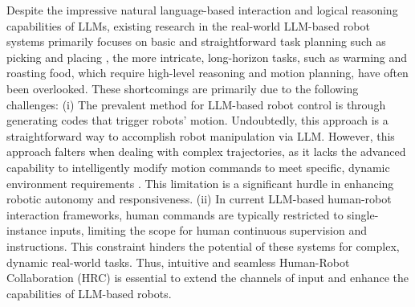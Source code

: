 \documentclass[letterpaper,conference]{ieeeconf}
\begin{document}
Despite the impressive natural language-based interaction and logical reasoning capabilities of LLMs, existing research in the real-world LLM-based robot systems primarily focuses on basic and straightforward task planning such as picking and placing \cite{singh2023progprompt,zhao2023differentiable}, the more intricate, long-horizon tasks, such as warming and roasting food, which require high-level reasoning and motion planning, have often been overlooked. 
These shortcomings are primarily due to the following challenges:
(i) The prevalent method for LLM-based robot control is through generating codes that trigger robots' motion. Undoubtedly, this approach is a straightforward way to accomplish robot manipulation via LLM. However, this approach falters when dealing with complex trajectories, as it lacks the advanced capability to intelligently modify motion commands to meet specific, dynamic environment requirements \cite{singh2023progprompt}. This limitation is a significant hurdle in enhancing robotic autonomy and responsiveness.
(ii) In current LLM-based human-robot interaction frameworks, human commands are typically restricted to single-instance inputs, limiting the scope for human continuous supervision and instructions. This constraint hinders the potential of these systems for complex, dynamic real-world tasks. Thus, intuitive and seamless Human-Robot Collaboration (HRC) is essential to extend the channels of input and enhance the capabilities of LLM-based robots.
\end{document}
